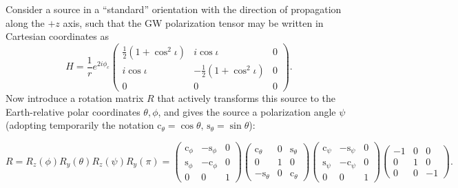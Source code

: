 \documentclass[amsmath,amssymb,aps,prx,reprint,nopreprintnumbers,nofootinbib]{revtex4-1}
\begin{document}
Consider a source in a ``standard'' orientation with the direction of propagation along the $+z$ axis, such that the \ac{GW} polarization tensor may be written in Cartesian coordinates as
%
\begin{equation}
    H = \frac{1}{r} e^{2 i \phi_c} \left(
    \begin{array}{ccc}
        \frac{1}{2}(1 + \cos^2 \iota) & i \cos\iota & 0 \\
        i \cos\iota & -\frac{1}{2}(1 + \cos^2 \iota) & 0 \\
        0 & 0 & 0
    \end{array}
    \right).
\end{equation}
%
Now introduce a rotation matrix $R$ that actively transforms this source to the Earth-relative polar coordinates $\theta, \phi$, and gives the source a polarization angle $\psi$ (adopting temporarily the notation $\mathrm{c}_\theta = \cos\theta,\,\mathrm{s}_\theta = \sin\theta$):
%
\begin{widetext}
\begin{equation}
    R = R_z(\phi) R_y(\theta) R_z(\psi) R_y(\pi)
    = \left(
        \begin{array}{ccc}
            \mathrm{c}_\phi & -\mathrm{s}_\phi & 0 \\
            \mathrm{s}_\phi & -\mathrm{c}_\phi & 0 \\
            0 & 0 & 1
        \end{array}
    \right)
    \left(
        \begin{array}{ccc}
            \mathrm{c}_\theta & 0 & \mathrm{s}_\theta \\
            0 & 1 & 0 \\
            -\mathrm{s}_\theta & 0 & \mathrm{c}_\theta
        \end{array}
    \right)
    \left(
        \begin{array}{ccc}
            \mathrm{c}_\psi & -\mathrm{s}_\psi & 0 \\
            \mathrm{s}_\psi & -\mathrm{c}_\psi & 0 \\
            0 & 0 & 1
        \end{array}
    \right)
    \left(
        \begin{array}{ccc}
            -1 & 0 & 0 \\
            0 & 1 & 0 \\
            0 & 0 & -1
        \end{array}
    \right).
\end{equation}
\end{widetext}
\end{document}
